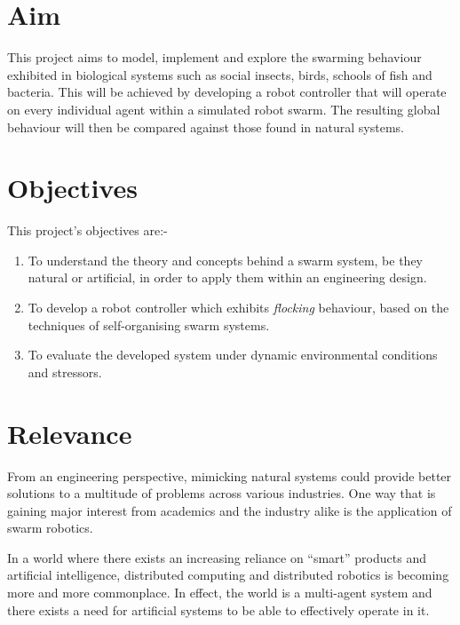 \section{Aim}
This project aims to model, implement and explore the swarming behaviour exhibited in biological systems such as social insects, birds, schools of fish and bacteria. This will be achieved by developing a robot controller that will operate on every individual agent within a simulated robot swarm. The resulting global behaviour will then be compared against those found in natural systems.


\section{Objectives}
 This project's objectives are:-

\begin{enumerate}
	\item To understand the theory and concepts behind a swarm system, be they natural or artificial, in order to apply them within an engineering design.
	\item To develop a robot controller which exhibits \textit{flocking} behaviour, based on the techniques of self-organising swarm systems.
	\item To evaluate the developed system under dynamic environmental conditions and stressors.
\end{enumerate}

\section{Relevance}

From an engineering perspective, mimicking natural systems could provide better solutions to a multitude of problems across various industries. One way that is gaining major interest from academics and the industry alike is the application of swarm robotics.

In a world where there exists an increasing reliance on ``smart'' products and artificial intelligence, distributed computing and distributed robotics is becoming more and more commonplace. In effect, the world is a multi-agent system and there exists a need for artificial systems to be able to effectively operate in it.

